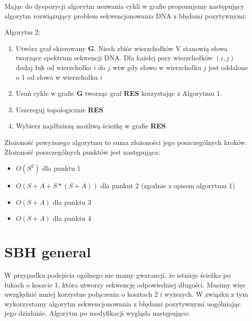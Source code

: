 \documentclass[a4paper,10pt]{article}
\begin{document}
Mając do dyspozycji algorytm usuwania cykli w grafie proponujemy następujący algorytm rozwiązujący problem sekwencjonowania DNA z błędami pozytywnymi:

Algorytm 2:
\begin{enumerate}
 \item Utwórz graf skierowany {\bf G}. Niech zbiór wierzchołków V stanowią słowa tworzące spektrum sekwencji DNA. Dla każdej pary wierzchołków $(i,j)$ dodaj łuk od wierzchołka $i$ do $j$ wtw gdy słowo w wierzchołku $j$ jest oddalone o 1 od słowa w wierzchołku $i$
 \item Usuń cykle w grafie {\bf G} tworząc graf {\bf RES} korzystając z Algorytmu 1.
 \item Uszereguj topologicznie {\bf RES}
 \item Wybierz najdłuższą możliwą ścieżkę w grafie {\bf RES}
\end{enumerate}

Złożoność powyższego algorytmu to suma złożoności jego poszczególnych kroków. Złożoność poszczególnych punktów jest następująca:
\begin{itemize}
 \item $O(S^2)$ dla punktu 1
 \item $O(S + A + S * (S + A))$ dla punkut 2 (zgodnie z opisem algorytmu 1)
 \item $O(S + A)$ dla punktu 3
 \item $O(S + A)$ dla punktu 4
\end{itemize}

\section{SBH general}
W przypadku podejścia ogólnego nie mamy gwarancji, że istnieje ścieżka po łukach o koszcie 1, która utworzy sekwencję odpowiedniej długości. Musimy więc uwzględnić mniej korzystne połączenia o kosztach 2 i wyższych. W związku z tym wykorzystamy algorytm sekwencjonowania z błędami pozytywnymi uogólniając jego działanie. Algorytm po modyfikacji wygląda następująco:
\end{document}
